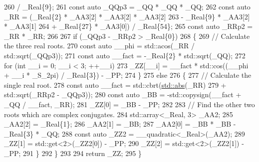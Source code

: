 \begin{DoxyCode}
260                          / \_Real\{9\};
261           \textcolor{keyword}{const} \textcolor{keyword}{auto} \_QQp3 = \_QQ * \_QQ * \_QQ;
262           \textcolor{keyword}{const} \textcolor{keyword}{auto} \_RR = (\_Real\{2\} * \_AA3[2] * \_AA3[2] * \_AA3[2]
263                           - \_Real\{9\} * \_AA3[2] * \_AA3[1]
264                           + \_Real\{27\} * \_AA3[0]) / \_Real\{54\};
265           \textcolor{keyword}{const} \textcolor{keyword}{auto} \_RRp2 = \_RR * \_RR;
266 
267           \textcolor{keywordflow}{if} (\_QQp3 - \_RRp2 > \_Real\{0\})
268             \{
269               \textcolor{comment}{// Calculate the three real roots.}
270               \textcolor{keyword}{const} \textcolor{keyword}{auto} \_\_phi = std::acos(\_RR / std::sqrt(\_QQp3));
271               \textcolor{keyword}{const} \textcolor{keyword}{auto} \_\_fact = -\_Real\{2\} * std::sqrt(\_QQ);
272               \textcolor{keywordflow}{for} (\textcolor{keywordtype}{int} \_\_i = 0; \_\_i < 3; ++\_\_i)
273                 \_ZZ[\_\_i] = \_\_fact * std::cos((\_\_phi + \_\_i * \_S\_2pi) / \_Real\{3\}) - \_PP;
274             \}
275           \textcolor{keywordflow}{else}
276             \{
277               \textcolor{comment}{// Calculate the single real root.}
278               \textcolor{keyword}{const} \textcolor{keyword}{auto} \_\_fact = std::cbrt(\hyperlink{namespace____gnu__cxx_ab9eb9db3560f504f8cd25a71bcb6ead5}{std::abs}(\_RR)
279                                           + std::sqrt(\_RRp2 - \_QQp3));
280               \textcolor{keyword}{const} \textcolor{keyword}{auto} \_BB = -std::copysign(\_\_fact + \_QQ / \_\_fact, \_RR);
281               \_ZZ[0] = \_BB - \_PP;
282 
283               \textcolor{comment}{// Find the other two roots which are complex conjugates.}
284               std::array<\_Real, 3> \_AA2;
285               \_AA2[2] = \_Real\{1\};
286               \_AA2[1] = \_BB;
287               \_AA2[0] = \_BB * \_BB - \_Real\{3\} * \_QQ;
288               \textcolor{keyword}{const} \textcolor{keyword}{auto} \_ZZ2 = \_\_quadratic<\_Real>(\_AA2);
289               \_ZZ[1] = std::get<2>(\_ZZ2[0]) - \_PP;
290               \_ZZ[2] = std::get<2>(\_ZZ2[1]) - \_PP;
291             \}
292         \}
293 
294       \textcolor{keywordflow}{return} \_ZZ;
295     \}
\end{DoxyCode}
\mbox{\label{namespace____gnu__cxx_ad1ce809c9dd84dd6cd0229fb73f7dbec}} 
